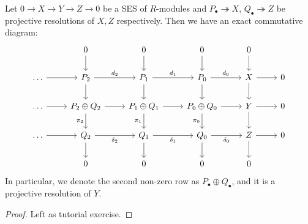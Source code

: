 \begin{thm} 
    Let $0\to X\to Y \to Z\to 0$ be a SES of $R$-modules and $P_\bullet \twoheadrightarrow X$, $Q_\bullet \twoheadrightarrow Z$ be projective resolutions of $X,Z$ respectively. Then we have an exact commutative diagram:
    \[\begin{tikzcd} [sep=small]
	&& 0 && 0 && 0 && 0 \\
	\\
	\dots && {P_2} && {P_1} && {P_0} && X && 0 \\
	\\
	\dots && {P_2 \oplus Q_2} && {P_1 \oplus Q_1} && {P_0 \oplus Q_0} && Y && 0 \\
	\\
	\dots && {Q_2} && {Q_1} && {Q_0} && Z && 0 \\
	\\
	&& 0 && 0 && 0 && 0
	\arrow[from=1-3, to=3-3]
	\arrow[from=1-5, to=3-5]
	\arrow[from=1-7, to=3-7]
	\arrow[from=1-9, to=3-9]
	\arrow[from=3-1, to=3-3]
	\arrow["{d_2}", from=3-3, to=3-5]
	\arrow[from=3-3, to=5-3]
	\arrow["{d_1}", from=3-5, to=3-7]
	\arrow[from=3-5, to=5-5]
	\arrow["{d_0}", from=3-7, to=3-9]
	\arrow[from=3-7, to=5-7]
	\arrow[from=3-9, to=3-11]
	\arrow[from=3-9, to=5-9]
	\arrow[from=5-1, to=5-3]
	\arrow[from=5-3, to=5-5]
	\arrow["{\pi_2}"', from=5-3, to=7-3]
	\arrow[from=5-5, to=5-7]
	\arrow["{\pi_1}"', from=5-5, to=7-5]
	\arrow[from=5-7, to=5-9]
	\arrow["{\pi_0}"', from=5-7, to=7-7]
	\arrow[from=5-9, to=5-11]
	\arrow[from=5-9, to=7-9]
	\arrow[from=7-1, to=7-3]
	\arrow["{\delta_2}"', from=7-3, to=7-5]
	\arrow[from=7-3, to=9-3]
	\arrow["{\delta_1}"', from=7-5, to=7-7]
	\arrow[from=7-5, to=9-5]
	\arrow["{\delta_0}"', from=7-7, to=7-9]
	\arrow[from=7-7, to=9-7]
	\arrow[from=7-9, to=7-11]
	\arrow[from=7-9, to=9-9]
	\end{tikzcd}\]
In particular, we denote the second non-zero row as $P_\bullet \oplus Q_\bullet$, and it is a projective resolution of $Y$.
\end{thm}
\begin{proof}
    Left as tutorial exercise.
\end{proof}

